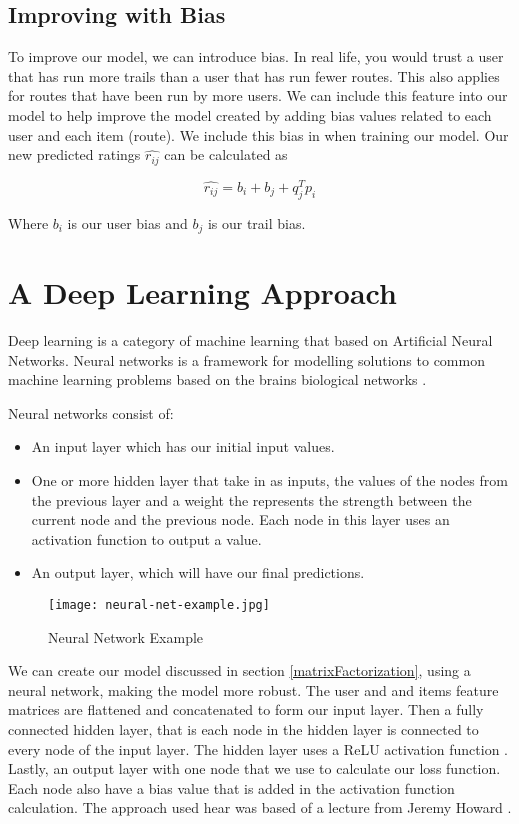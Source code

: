 \subsection{Improving with Bias}
To improve our model, we can introduce bias. In real life, you would trust a user that has run more trails than a user that has run fewer routes. This also applies for routes that have been run by more users. We can include this feature into our model to help improve the model created by adding bias values related to each user and each item (route). We include this bias in when training our model. Our new predicted ratings $\hat{r_{ij}}$ can be calculated as

\begin{equation}
    \hat{r_{ij}} = b_i + b_j + {q^{T}_{j}}{p_i}
\end{equation}

Where $b_i$ is our user bias and $b_j$ is our trail bias.

\section{A Deep Learning Approach} \label{neuralNetwork}
Deep learning is a category of machine learning that based on Artificial Neural Networks. Neural networks is a framework for modelling solutions to common machine learning problems based on the brains biological networks \cite{van2018artificial}. 

Neural networks consist of:
\begin{itemize}
    \item An input layer which has our initial input values.
    \item One or more hidden layer that take in as inputs, the values of the nodes from the previous layer and a weight the represents the strength between the current node and the previous node. Each node in this layer uses an activation function to output a value.
    \item An output layer, which will have our final predictions.
\end{itemize}

\begin{figure}[ht]
    \centering
    \texttt{[image: neural-net-example.jpg]}
    \caption{Neural Network Example \cite{neuralNet}}
    \label{fig:neuralNetworkExample}
\end{figure}


We can create our model discussed in section \ref{matrixFactorization}, using a neural network, making the model more robust. The user and and items feature matrices are flattened and concatenated to form our input layer. Then a fully connected hidden layer, that is each node in the hidden layer is connected to every node of the input layer. The hidden layer uses a ReLU activation function \cite{li2017convergence}. Lastly, an output layer with one node that we use to calculate our loss function. Each node also have a bias value that is added in the activation function calculation. The approach used hear was based of a lecture from Jeremy Howard \cite{jeremy2016deep}.

